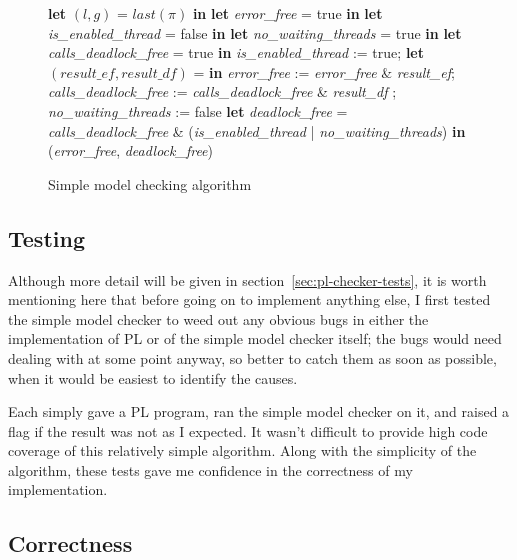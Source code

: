 \documentclass[12pt,a4paper,twoside,openright]{report}
\newcommand{\Let}[2]{\State \textbf{let} #1 = #2 \textbf{in}}
\begin{document}
\begin{figure}
	\begin{algorithmic}[1]
		\Let{$(l, g)$}
			{$\textit{last}(\pi)$}
		\Let{\textit{error\_free}}{true}
		\Let{\textit{is\_enabled\_thread}}{false}
		\Let{\textit{no\_waiting\_threads}}{true}
		\Let{\textit{calls\_deadlock\_free}}{true}
			\State \textit{is\_enabled\_thread} := true;
			\Let{$(\textit{result\_ef}, \textit{result\_df})$}
				{\Call{Check}{$\sigma_0, \pi.\textit{next}(\sigma, p)$}}
			\State \textit{error\_free} := \textit{error\_free}
				\& \textit{result\_ef};
			\State \textit{calls\_deadlock\_free}
			:= \textit{calls\_deadlock\_free}
			\& \textit{result\_df}
		\Else
			;
			\EndIf
				{\textit{no\_waiting\_threads} := false}
			\EndIf
		\EndIf
		\EndFor
		\Let{\textit{deadlock\_free}}{\textit{calls\_deadlock\_free} \&
			(\textit{is\_enabled\_thread} | \textit{no\_waiting\_threads})}
		\State \Return (\textit{error\_free}, \textit{deadlock\_free})
		\EndProcedure
	\end{algorithmic}
	\caption{Simple model checking algorithm}
	\label{fig:simple-imp-code}
\end{figure}

\subsection{Testing}

Although more detail will be given in
section~\ref{sec:pl-checker-tests}, it
is worth mentioning here that before going
on to implement anything else, I first
tested the simple model checker to weed
out any obvious bugs in either the
implementation of PL or of the simple
model checker itself; the bugs would need
dealing with at some point anyway, so
better to catch them as soon as possible,
when it would be easiest to identify the
causes.

Each simply gave a PL program,
ran the simple model checker on it, and
raised a flag if the result was not as
I expected. It wasn't difficult to
provide high code coverage of this
relatively simple algorithm. Along
with the simplicity of the algorithm,
these tests gave me confidence in
the correctness of my implementation.

\subsection{Correctness}
\end{document}

